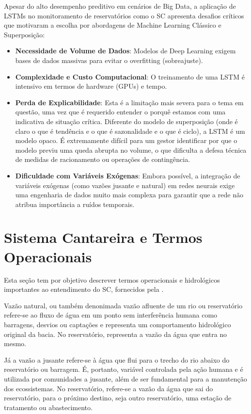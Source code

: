 Apesar do alto desempenho preditivo em cenários de Big Data, a aplicação de \acrshort{LSTM}s no monitoramento de reservatórios como o \acrshort{SC} apresenta desafios críticos que motivaram a escolha por abordagens de Machine Learning Clássico e Superposição: 

\begin{itemize}
\item \textbf{Necessidade de Volume de Dados}: Modelos de Deep Learning exigem bases de dados massivas para evitar o overfitting (sobreajuste).  
\item \textbf{Complexidade e Custo Computacional}: O treinamento de uma LSTM é intensivo em termos de hardware (GPUs) e tempo.  
\item \textbf{Perda de Explicabilidade}: Esta é a limitação mais severa para o tema em questão, uma vez que é requerido entender o porquê estamos com uma indicativa de situação crítica. Diferente do modelo de superposição (onde é claro o que é tendência e o que é sazonalidade e o que é ciclo), a \acrshort{LSTM} é um modelo opaco. É extremamente difícil para um gestor identificar por que o modelo previu uma queda abrupta no volume, o que dificulta a defesa técnica de medidas de racionamento ou operações de contingência. 
\item \textbf{Dificuldade com Variáveis Exógenas}: Embora possível, a integração de variáveis exógenas (como vazões jusante e natural) em redes neurais exige uma engenharia de dados muito mais complexa para garantir que a rede não atribua importância a ruídos temporais.
\end{itemize}

\section{Sistema Cantareira e Termos Operacionais}

Esta seção tem por objetivo descrever termos operacionais e hidrológicos importantes ao entendimento do \acrshort{SC}, fornecidos pela \cite{ANA_GlossarioCantareira_2019}. 

Vazão natural, ou também denonimada vazão afluente de um rio ou reservatório refere-se ao fluxo de água em um ponto sem interferência humana como barragens, desvios ou captações e representa um comportamento hidrológico original da bacia. No reservatório, representa a vazão da água que entra no mesmo.  

Já a vazão a jusante refere-se à água que flui para o trecho do rio abaixo do reservatório ou barragem. É, portanto, variável controlada pela ação humana e é utilizada por comunidades a jusante, além de ser fundamental para a manutenção dos ecossistemas. No reservatório, refere-se a vazão da água que sai do reservatório, para o próximo destino, seja outro reservatório, uma estação de tratamento ou abastecimento.  

